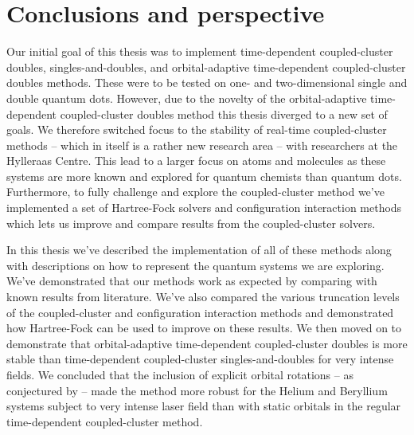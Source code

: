 \chapter{Conclusions and perspective}
    Our initial goal of this thesis was to implement time-dependent
    coupled-cluster doubles, singles-and-doubles, and orbital-adaptive
    time-dependent coupled-cluster doubles methods.
    These were to be tested on one- and two-dimensional single and double
    quantum dots.
    However, due to the novelty of the  orbital-adaptive time-dependent
    coupled-cluster doubles method this thesis diverged to a new set of goals.
    We therefore switched focus to the stability of real-time coupled-cluster
    methods -- which in itself is a rather new research area -- with researchers
    at the Hylleraas Centre.
    This lead to a larger focus on atoms and molecules as these systems are more
    known and explored for quantum chemists than quantum dots.
    Furthermore, to fully challenge and explore the coupled-cluster method we've
    implemented a set of Hartree-Fock solvers and configuration interaction
    methods which lets us improve and compare results from the coupled-cluster
    solvers.

    In this thesis we've described the implementation of all of these methods
    along with descriptions on how to represent the quantum systems we are
    exploring.
    We've demonstrated that our methods work as expected by comparing with known
    results from literature.
    We've also compared the various truncation levels of the coupled-cluster
    and configuration interaction methods and demonstrated how Hartree-Fock can
    be used to improve on these results.
    We then moved on to demonstrate that orbital-adaptive time-dependent
    coupled-cluster doubles is more stable than time-dependent coupled-cluster
    singles-and-doubles for very intense fields.
    We concluded that the inclusion of explicit orbital rotations -- as
    conjectured by \citeauthor{pedersen2018symplectic}
    \cite{pedersen2018symplectic} -- made the method more robust for the Helium
    and Beryllium systems subject to very intense laser field than with static
    orbitals in the regular time-dependent coupled-cluster method.

